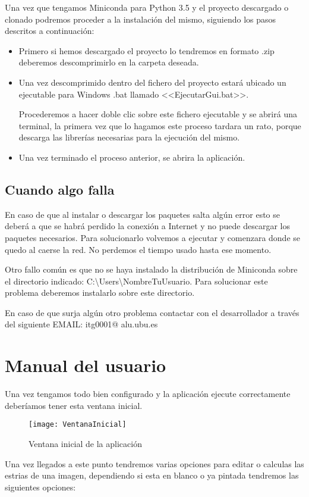 Una vez que tengamos Miniconda para Python 3.5 y el proyecto descargado o clonado podremos proceder a la instalación del mismo, siguiendo los pasos descritos a continuación:

\begin{itemize}
	\item Primero si hemos descargado el proyecto lo tendremos en formato .zip deberemos descomprimirlo en la carpeta deseada.
	
	\item Una vez descomprimido dentro del fichero del proyecto estará ubicado un ejecutable para Windows .bat llamado <<EjecutarGui.bat>>.
	
	Procederemos a hacer doble clic sobre este fichero ejecutable y se abrirá una terminal, la primera vez que lo hagamos este proceso tardara un rato, porque descarga las librerías necesarias para la ejecución del mismo.
	
	\item Una vez terminado el proceso anterior, se abrira la aplicación.
\end{itemize}

\subsection{Cuando algo falla}
En caso de que al instalar o descargar los paquetes salta algún error esto se deberá a que se habrá perdido la conexión a Internet y no puede descargar los paquetes necesarios.
Para solucionarlo volvemos a ejecutar y comenzara donde se quedo al caerse la red. No perdemos el tiempo usado hasta ese momento.

Otro fallo común es que no se haya instalado la distribución de Miniconda sobre el directorio indicado: C:\textbackslash Users\textbackslash NombreTuUsuario.
Para solucionar este problema deberemos instalarlo sobre este directorio.

En caso de que surja algún otro problema contactar con el desarrollador a través del siguiente EMAIL: itg0001\makeatletter @ alu.ubu.es 

\section{Manual del usuario}

Una vez tengamos todo bien configurado y la aplicación ejecute correctamente deberíamos tener esta ventana inicial.

\begin{figure}[h]
\centering
\texttt{[image: VentanaInicial]}
\caption{Ventana inicial de la aplicación}
\label{fig:E.1}
\end{figure}
Una vez llegados a este punto tendremos varias opciones para editar o calculas las estrias de una imagen, dependiendo si esta en blanco o ya pintada tendremos las siguientes opciones:

